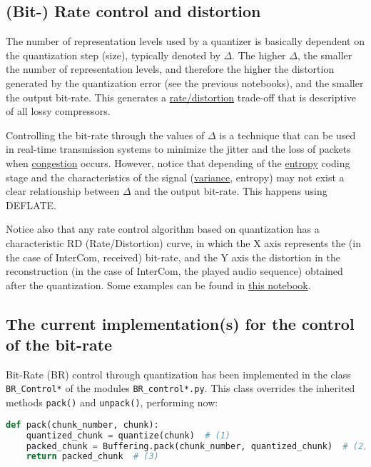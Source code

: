 
\subsection{(Bit-) Rate control and distortion}
The number of representation levels used by a quantizer is basically dependent on the quantization step (size), typically denoted
by $\Delta$. The higher $\Delta$, the smaller the number of
representation levels, and therefore the higher the distortion
generated by the quantization error (see the previous notebooks), and
the smaller the output bit-rate. This generates a
\href{https://en.wikipedia.org/wiki/Rate%E2%80%93distortion_theory}{rate/distortion}
  trade-off that is descriptive of all lossy compressors.

Controlling the bit-rate through the values of $\Delta$ is a technique
that can be used in real-time transmission systems to minimize the
jitter and the loss of packets when
\href{https://en.wikipedia.org/wiki/Network_congestion}{congestion}
occurs. However, notice that depending of the
\href{https://en.wikipedia.org/wiki/Entropy_(information_theory)}{entropy}
coding stage and the characteristics of the signal
(\href{https://en.wikipedia.org/wiki/Variance}{variance}, entropy) may
not exist a clear relationship between $\Delta$ and the output
bit-rate. This happens using DEFLATE.

Notice also that any rate control algorithm based on quantization has a
characteristic RD (Rate/Distortion) curve, in which the X axis
represents the (in the case of InterCom, received) bit-rate, and the Y
axis the distortion in the reconstruction (in the case of InterCom,
the played audio sequence) obtained after the quantization. Some
examples can be found
in \href{https://github.com/Tecnologias-multimedia/Tecnologias-multimedia.github.io/blob/master/study_guide/BR_control/audio_quantization.ipynb}{this
notebook}.

\subsection{The current implementation(s) for the control of the bit-rate}
Bit-Rate (BR) control through quantization has been implemented in the
class \verb|BR_Control*| of the modules \texttt{BR\_control*.py}. This
class overrides the inherited methods \verb|pack()| and
\verb|unpack()|, performing now:

\begin{lstlisting}[language=Python]
  def pack(chunk_number, chunk):
    quantized_chunk = quantize(chunk)  # (1)
    packed_chunk = Buffering.pack(chunk_number, quantized_chunk)  # (2)
    return packed_chunk  # (3)
\end{lstlisting}

